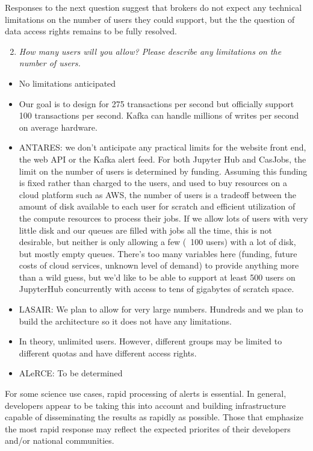 \documentclass{article}
\begin{document}
Responses to the next question suggest that brokers do not expect any technical limitations on the number of users they could support, but the the question of data access rights remains to be fully resolved.  

\begin{enumerate}
\setcounter{enumi}{1}
\item {\em How many users will you allow? Please describe any limitations on the number of users.}
\end{enumerate}

\begin{itemize}
\item No limitations anticipated
\item Our goal is to design for 275 transactions per second but officially support 100 transactions per second.  Kafka can handle millions of writes per second on average hardware.
\item ANTARES: we don’t anticipate any practical limits for the website front end, the web API or the Kafka alert feed. For both Jupyter Hub and CasJobs, the limit on the number of users is determined by funding. Assuming this funding is fixed rather than charged to the users, and used to buy resources on a cloud platform such as AWS, the number of users is a tradeoff between the amount of disk available to each user for scratch and efficient utilization of the compute resources to process their jobs. If we allow lots of users with very little disk and our queues are filled with jobs all the time, this is not desirable, but neither is only allowing a few (~100 users) with a lot of disk, but mostly empty queues. There’s too many variables here (funding, future costs of cloud services, unknown level of demand) to provide anything more than a wild guess, but we’d like to be able to support at least 500 users on JupyterHub concurrently with access to tens of gigabytes of scratch space.
\item LASAIR: We plan to allow for very large numbers. Hundreds and we plan to build the architecture so it does not have any limitations. 
\item In theory, unlimited users. However, different groups may be limited to different quotas and have different access rights.
\item ALeRCE: To be determined
\end{itemize}

For some science use cases, rapid processing of alerts is essential.  In general, developers appear to be taking this into account and building infrastructure capable of disseminating the results as rapidly as possible.  Those that emphasize the most rapid response may reflect the expected priorites of their developers and/or national communities.  
\end{document}
